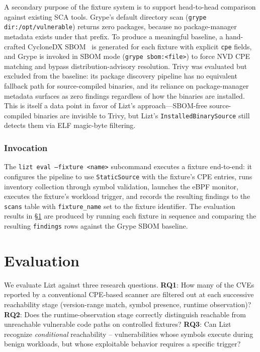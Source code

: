 \documentclass[conference]{IEEEtran}
\begin{document}
A secondary purpose of the fixture system is to support head-to-head comparison against existing SCA tools.
Grype's default directory scan (\texttt{grype dir:/opt/vulnerable}) returns zero packages, because no package-manager metadata exists under that prefix.
To produce a meaningful baseline, a hand-crafted CycloneDX SBOM~\cite{cyclonedx} is generated for each fixture with explicit \texttt{cpe} fields, and Grype is invoked in SBOM mode (\texttt{grype sbom:<file>}) to force NVD CPE matching and bypass distribution-advisory resolution.
Trivy was evaluated but excluded from the baseline: its package discovery pipeline has no equivalent fallback path for source-compiled binaries, and its reliance on package-manager metadata surfaces as zero findings regardless of how the binaries are installed.
This is itself a data point in favor of Lizt's approach---SBOM-free source-compiled binaries are invisible to Trivy, but Lizt's \texttt{InstalledBinarySource} still detects them via ELF magic-byte filtering.

\subsubsection{Invocation}

The \texttt{lizt eval --fixture <name>} subcommand executes a fixture end-to-end: it configures the pipeline to use \texttt{StaticSource} with the fixture's CPE entries, runs inventory collection through symbol validation, launches the eBPF monitor, executes the fixture's workload trigger, and records the resulting findings to the \texttt{scans} table with \texttt{fixture\_name} set to the fixture identifier.
The evaluation results in \S\ref{sec:eval} are produced by running each fixture in sequence and comparing the resulting \texttt{findings} rows against the Grype SBOM baseline.

\section{Evaluation}
\label{sec:eval}

We evaluate Lizt against three research questions.
\textbf{RQ1}: How many of the CVEs reported by a conventional CPE-based scanner are filtered out at each successive reachability stage (version-range match, symbol presence, runtime observation)?
\textbf{RQ2}: Does the runtime-observation stage correctly distinguish reachable from unreachable vulnerable code paths on controlled fixtures?
\textbf{RQ3}: Can Lizt recognize \emph{conditional} reachability -- vulnerabilities whose symbols execute during benign workloads, but whose exploitable behavior requires a specific trigger?
\end{document}
